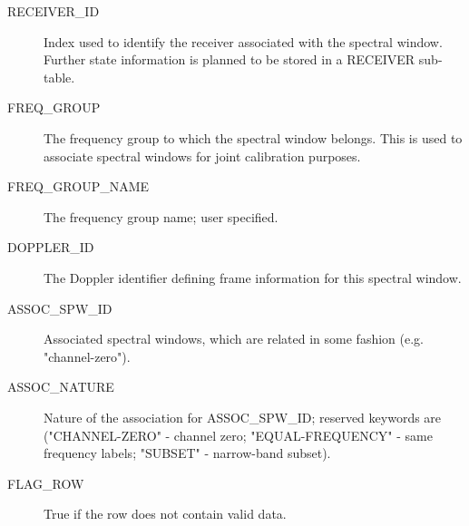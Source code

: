 \documentclass{article}
\begin{document}
\begin{description}
\item[RECEIVER\_ID] Index used to identify the receiver associated
with the spectral window. Further state information is planned to be
stored in a RECEIVER sub-table.

\item[FREQ\_GROUP] The frequency group to which the spectral window belongs.
This is used to associate spectral windows for joint calibration purposes.

\item[FREQ\_GROUP\_NAME] The frequency group name; user specified.

\item[DOPPLER\_ID] The Doppler identifier defining frame information
for this spectral window.

\item[ASSOC\_SPW\_ID] Associated spectral windows, which are related
in some fashion (e.g. "channel-zero").

\item[ASSOC\_NATURE] Nature of the association for ASSOC\_SPW\_ID;
reserved keywords are ("CHANNEL-ZERO" - channel zero;
"EQUAL-FREQUENCY" - same frequency labels; "SUBSET" - narrow-band
subset).

\item[FLAG\_ROW] True if the row does not contain valid data.

\end{description}
\end{document}
